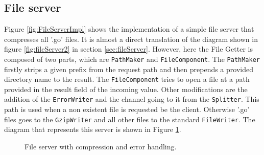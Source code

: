 \documentclass[12pt,a4paper]{article}
\begin{document}
\newpage
\subsection{File server}
Figure \ref{fig:FileServerImpl} shows the implementation of a simple 
file server that compresses all '.go' files. It is almost a direct translation
of the diagram shown in figure \ref{fig:fileServer2} in section \ref{sec:fileServer}.
However, here the File Getter is composed of two parts, which are \texttt{PathMaker}
and \texttt{FileComponent}. The \texttt{PathMaker} firstly strips a given
prefix from the request path and then prepends a provided directory name to 
the result. The \texttt{FileComponent} tries to open a file at a path 
provided in the result field of the incoming value. Other modifications
are the addition of the \texttt{ErrorWriter} and the channel going to it from
the \texttt{Splitter}.
This path is used when a non existent file is requested be the client.
Otherwise '.go' files goes to the \texttt{GzipWriter} and all other files to 
the standard \texttt{FileWriter}.
The diagram that represents this server is shown in 
Figure \ref{fig:fileServer3}.

\begin{figure}[h]
\centering
{}
\caption[scale=1.0]{File server with compression and error handling.}
\label{fig:fileServer3}
\end{figure}
\end{document}
